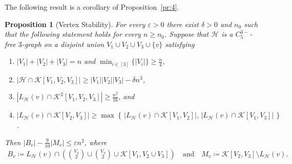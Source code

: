 \documentclass[11pt,a4paper]{article}
\newtheorem{proposition}[definition]{Proposition}
\theoremstyle{remark}
\newcommand{\C}[1]{\mathcal{#1}}
\newcommand{\hide}[1]{}
\begin{document}

The following result is a corollary of Proposition~\ref{pr:4}. 
%
\begin{proposition}[Vertex Stability]
\label{pr:5}
    For every $\varepsilon > 0$ there exist $\delta>0$ and $n_0$ such that the following statement holds for every $n \ge n_0$. 
    Suppose that $\mathcal{H}$ is a $C_{5}^{3-}$-free $3$-graph on a disjoint union $V_1 \cup V_2 \cup V_3 \cup \{v\}$ satisfying 
    \begin{enumerate}[label=(\roman*)]
        \item\label{it:51} $|V_1| + |V_2| + |V_3| = n$ and $\min_{i\in [3]}\{|V_i|\} \ge \frac{n}{4}$, 
        \item\label{it:52} $|\mathcal{H}\cap \C K[V_1, V_2, V_3]| \ge |V_1||V_2||V_3| - \delta n^3$, 
        \item\label{it:53} 
        $|L_{\mathcal{H}}(v) \cap \mathcal{K}^2[V_1, V_2,V_3]| \ge \frac{n^2}{16}$, and 
        \item\label{it:54} $|L_{\mathcal{H}}(v) \cap \mathcal{K}[V_2, V_3]| \ge \max\left\{\,|L_{\mathcal{H}}(v) \cap \mathcal{K}[V_1, V_2]|,\,|L_{\mathcal{H}}(v) \cap \mathcal{K}[V_1, V_3]|\,\right\}$. 
    \end{enumerate}
    Then $|B_{v}| - \frac{9}{10}|M_{v}| \le \varepsilon n^2$, where 
    \begin{align*}
        B_{v}
        \coloneqq L_{\mathcal{H}}(v) \cap \left( \binom{V_2}{2} \cup \binom{V_3}{2} \cup \mathcal{K}[V_1, V_2\cup V_3]\right)
        \quad\text{and}\quad 
        M_{v}
        \coloneqq \mathcal{K}[V_2, V_3] \setminus L_{\mathcal{H}}(v). 
    \end{align*}
\hide{    In particular, 
    \begin{align*}
        \left|L_{\mathcal{H}}(v) \setminus \binom{V_1}{2}\right|
        \le |V_2||V_3| - \max\left\{\frac{|B_{v}|}{9},\,\frac{|M_{v}|}{10} \right\} + \varepsilon n^2.
    \end{align*}
    }
\end{proposition}
\end{document}
